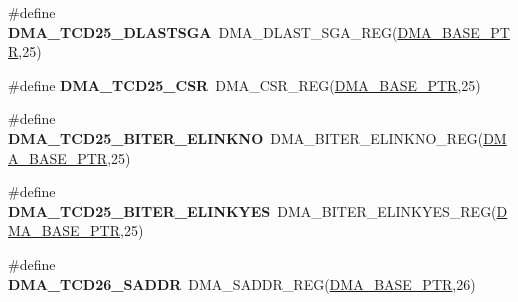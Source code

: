 \begin{DoxyCompactItemize}
\item 
\hypertarget{group___d_m_a___register___accessor___macros_ga3a3d4b9a9a71ebf362198ec6ede53b61}{}\#define {\bfseries D\+M\+A\+\_\+\+T\+C\+D25\+\_\+\+D\+L\+A\+S\+T\+S\+G\+A}~D\+M\+A\+\_\+\+D\+L\+A\+S\+T\+\_\+\+S\+G\+A\+\_\+\+R\+E\+G(\hyperlink{group___d_m_a___peripheral_ga6997fbc1b1973e9f27170217a3bd6f22}{D\+M\+A\+\_\+\+B\+A\+S\+E\+\_\+\+P\+T\+R},25)\label{group___d_m_a___register___accessor___macros_ga3a3d4b9a9a71ebf362198ec6ede53b61}

\item 
\hypertarget{group___d_m_a___register___accessor___macros_ga50c7849c2c7bebdd21d50a2e436a1f49}{}\#define {\bfseries D\+M\+A\+\_\+\+T\+C\+D25\+\_\+\+C\+S\+R}~D\+M\+A\+\_\+\+C\+S\+R\+\_\+\+R\+E\+G(\hyperlink{group___d_m_a___peripheral_ga6997fbc1b1973e9f27170217a3bd6f22}{D\+M\+A\+\_\+\+B\+A\+S\+E\+\_\+\+P\+T\+R},25)\label{group___d_m_a___register___accessor___macros_ga50c7849c2c7bebdd21d50a2e436a1f49}

\item 
\hypertarget{group___d_m_a___register___accessor___macros_gacd80bfd095404e7e28f5163e8483ff16}{}\#define {\bfseries D\+M\+A\+\_\+\+T\+C\+D25\+\_\+\+B\+I\+T\+E\+R\+\_\+\+E\+L\+I\+N\+K\+N\+O}~D\+M\+A\+\_\+\+B\+I\+T\+E\+R\+\_\+\+E\+L\+I\+N\+K\+N\+O\+\_\+\+R\+E\+G(\hyperlink{group___d_m_a___peripheral_ga6997fbc1b1973e9f27170217a3bd6f22}{D\+M\+A\+\_\+\+B\+A\+S\+E\+\_\+\+P\+T\+R},25)\label{group___d_m_a___register___accessor___macros_gacd80bfd095404e7e28f5163e8483ff16}

\item 
\hypertarget{group___d_m_a___register___accessor___macros_ga8041164941655e3f9bff43f3be6faaf4}{}\#define {\bfseries D\+M\+A\+\_\+\+T\+C\+D25\+\_\+\+B\+I\+T\+E\+R\+\_\+\+E\+L\+I\+N\+K\+Y\+E\+S}~D\+M\+A\+\_\+\+B\+I\+T\+E\+R\+\_\+\+E\+L\+I\+N\+K\+Y\+E\+S\+\_\+\+R\+E\+G(\hyperlink{group___d_m_a___peripheral_ga6997fbc1b1973e9f27170217a3bd6f22}{D\+M\+A\+\_\+\+B\+A\+S\+E\+\_\+\+P\+T\+R},25)\label{group___d_m_a___register___accessor___macros_ga8041164941655e3f9bff43f3be6faaf4}

\item 
\hypertarget{group___d_m_a___register___accessor___macros_ga0ddac7044bb2c74b1dad275b43039071}{}\#define {\bfseries D\+M\+A\+\_\+\+T\+C\+D26\+\_\+\+S\+A\+D\+D\+R}~D\+M\+A\+\_\+\+S\+A\+D\+D\+R\+\_\+\+R\+E\+G(\hyperlink{group___d_m_a___peripheral_ga6997fbc1b1973e9f27170217a3bd6f22}{D\+M\+A\+\_\+\+B\+A\+S\+E\+\_\+\+P\+T\+R},26)\label{group___d_m_a___register___accessor___macros_ga0ddac7044bb2c74b1dad275b43039071}


\end{DoxyCompactItemize}
